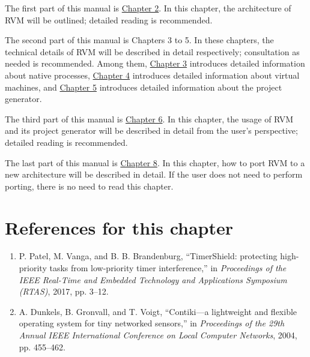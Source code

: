 The first part of this manual is \protect\hyperref[sec:2-1]{Chapter 2}.
In this chapter, the architecture of RVM will be outlined; detailed reading is recommended.

The second part of this manual is Chapters 3 to 5. In these chapters, the technical details of RVM will be described in detail respectively; consultation as needed is recommended. Among them, \protect\hyperref[sec:3-1]{Chapter 3}
introduces detailed information about native processes, \protect\hyperref[sec:4-1]{Chapter 4}
introduces detailed information about virtual machines, and \protect\hyperref[sec:5-1]{Chapter 5}
introduces detailed information about the project generator.

The third part of this manual is \protect\hyperref[ch:6-using-rvm]{Chapter 6}.
In this chapter, the usage of RVM and its project generator will be described in detail from the user's perspective; detailed reading is recommended.

The last part of this manual is \protect\hyperref[sec:8-1]{Chapter 8}.
In this chapter, how to port RVM to a new architecture will be described in detail. If the user does not need to perform porting, there is no need to read this chapter.

\section{References for this chapter}\label{sec:1-4}

\begin{enumerate}
\def\labelenumi{{[}\arabic{enumi}{]}}
\item
  \protect{}\label{cite:1-1}
  P. Patel, M. Vanga, and B. B. Brandenburg, ``TimerShield: protecting
  high-priority tasks from low-priority timer interference,'' in
  \textit{Proceedings of the IEEE Real-Time and Embedded Technology and
  Applications Symposium (RTAS)}, 2017, pp. 3--12.
\item
  \protect{}\label{cite:1-2}
  A. Dunkels, B. Gronvall, and T. Voigt, ``Contiki---a lightweight and
  flexible operating system for tiny networked sensors,'' in
  \textit{Proceedings of the 29th Annual IEEE International Conference
  on Local Computer Networks}, 2004, pp. 455--462.
\end{enumerate}
